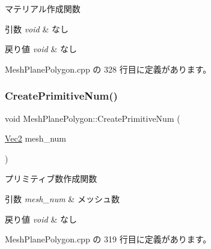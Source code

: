 マテリアル作成関数 


\begin{DoxyParams}{引数}
{\em void} & なし \\
\hline
\end{DoxyParams}

\begin{DoxyRetVals}{戻り値}
{\em void} & なし \\
\hline
\end{DoxyRetVals}


 Mesh\+Plane\+Polygon.\+cpp の 328 行目に定義があります。

\mbox{\label{class_mesh_plane_polygon_a0228c78794fe950ccb69b3a77a0239b8}} 
\subsubsection{\texorpdfstring{Create\+Primitive\+Num()}{CreatePrimitiveNum()}}
{\footnotesize\ttfamily void Mesh\+Plane\+Polygon\+::\+Create\+Primitive\+Num (\begin{DoxyParamCaption}\item[{\mbox{\hyperlink{_vector3_d_8h_a5ef6e95dfc5f9d3820b71772d99bbc25}{Vec2}}}]{mesh\+\_\+num }\end{DoxyParamCaption})\hspace{0.3cm}{\ttfamily [private]}}



プリミティブ数作成関数 


\begin{DoxyParams}{引数}
{\em mesh\+\_\+num} & メッシュ数 \\
\hline
\end{DoxyParams}

\begin{DoxyRetVals}{戻り値}
{\em void} & なし \\
\hline
\end{DoxyRetVals}


 Mesh\+Plane\+Polygon.\+cpp の 319 行目に定義があります。

\mbox{\label{class_mesh_plane_polygon_a50cdb56a3faa5d0bbb8ff75c3dcc2830}} 
